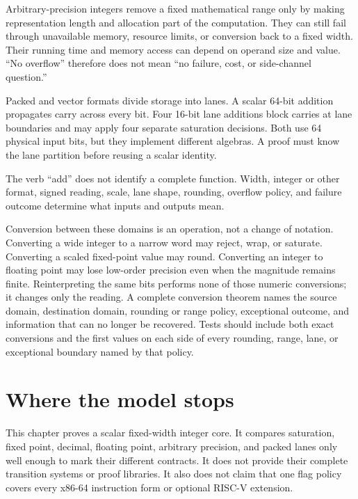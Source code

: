 Arbitrary-precision integers remove a fixed mathematical range only by making
representation length and allocation part of the computation. They can still
fail through unavailable memory, resource limits, or conversion back to a
fixed width. Their running time and memory access can depend on operand size
and value. ``No overflow'' therefore does not mean ``no failure, cost, or
side-channel question.''

Packed and vector formats divide storage into lanes. A scalar 64-bit addition
propagates carry across every bit. Four 16-bit lane additions block carries at
lane boundaries and may apply four separate saturation decisions. Both use 64
physical input bits, but they implement different algebras. A proof must know
the lane partition before reusing a scalar identity.

\begin{sidebar}[title={Representation is part of the arithmetic operation}]
The verb ``add'' does not identify a complete function. Width, integer or other
format, signed reading, scale, lane shape, rounding, overflow policy, and
failure outcome determine what inputs and outputs mean.
\end{sidebar}

Conversion between these domains is an operation, not a change of notation.
Converting a wide integer to a narrow word may reject, wrap, or saturate.
Converting a scaled fixed-point value may round. Converting an integer to
floating point may lose low-order precision even when the magnitude remains
finite. Reinterpreting the same bits performs none of those numeric
conversions; it changes only the reading. A complete conversion theorem names
the source domain, destination domain, rounding or range policy, exceptional
outcome, and information that can no longer be recovered.
Tests should include both exact conversions and the first values on each side
of every rounding, range, lane, or exceptional boundary named by that policy.

\section{Where the model stops}

This chapter proves a scalar fixed-width integer core. It compares saturation,
fixed point, decimal, floating point, arbitrary precision, and packed lanes
only well enough to mark their different contracts. It does not provide their
complete transition systems or proof libraries. It also does not claim that
one flag policy covers every x86-64 instruction form or optional RISC-V
extension.

